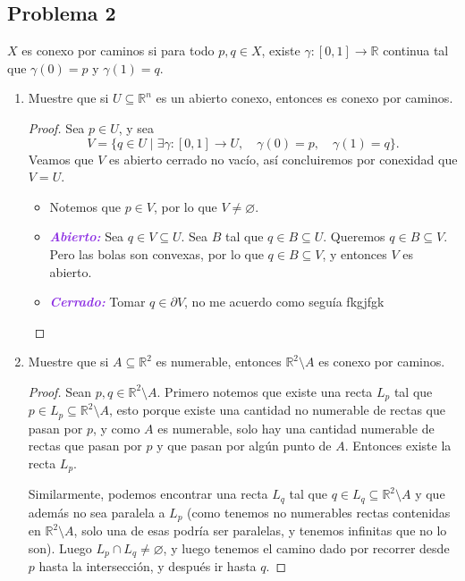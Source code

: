 \documentclass{article}
\theoremstyle{definition}
\theoremstyle{remark}
\numberwithin{equation}{section}
\newcommand{\R}{\mathbb{R}}
\newcommand{\wea}[1]{\textcolor{BlueViolet}{\textbf{\emph{#1}}}}
\begin{document}
\subsection{Problema 2}
$X$ es conexo por caminos si para todo $p,q \in X$, existe $\gamma \colon [0,1] \to \R$ continua tal que $\gamma(0) = p$ y $\gamma(1) = q$.
\begin{enumerate}
\item Muestre que si $U \subseteq \R^n$ es un abierto conexo, entonces es conexo por caminos.
\begin{proof}
  Sea $p \in U$, y sea
  \[V = \{q \in U \mid \exists \gamma \colon [0,1] \to U, \quad \gamma(0) = p, \quad \gamma(1) = q\}.\]
  Veamos que $V$ es abierto cerrado no vacío, así concluiremos por conexidad que $V = U$.

  \begin{itemize}
    \item Notemos que $p \in V$, por lo que $V \neq \varnothing$.
    \item \wea{Abierto: }
    Sea $q \in V \subseteq U$. Sea $B$ tal que $q \in B \subseteq U$.
    Queremos $q \in B \subseteq V$. Pero las bolas son convexas, por lo que $q \in B \subseteq V$, y entonces $V$ es abierto.
    \item \wea{Cerrado: }
    Tomar $q \in \partial V$, no me acuerdo como seguía fkgjfgk
  \end{itemize}
\end{proof}

\item Muestre que si $A \subseteq \R^2$ es numerable, entonces $\R^2 \setminus A$ es conexo por caminos.
\begin{proof}
  Sean $p,q \in \R^2 \setminus A$. Primero notemos que existe una recta $L_p$ tal que $p \in L_p \subseteq \R^2 \setminus A$, esto porque existe una cantidad no numerable de rectas que pasan por $p$, y como $A$ es numerable, solo hay una cantidad numerable de rectas que pasan por $p$ y que pasan por algún punto de $A$. Entonces existe la recta $L_p$.

  Similarmente, podemos encontrar una recta $L_q$ tal que $q \in L_q \subseteq \R^2 \setminus A$ y que además no sea paralela a $L_p$ (como tenemos no numerables rectas contenidas en $\R^2 \setminus A$, solo una de esas podría ser paralelas, y tenemos infinitas que no lo son). Luego $L_p \cap L_q \neq \varnothing$, y luego tenemos el camino dado por recorrer desde $p$ hasta la intersección, y después ir hasta $q$.
\end{proof}
\end{enumerate}
\end{document}

